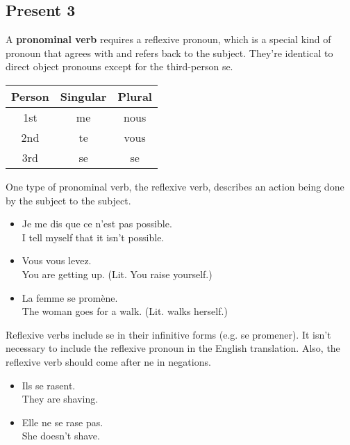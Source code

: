 \subsection{Present 3}

A \textbf{pronominal verb} requires a reflexive pronoun, which is a special kind of pronoun that agrees with and refers back to the subject. They're identical to direct object pronouns except for the third-person se.

\begin{center}\begin{tabular}{|c|c|c|}
\hline
\textbf{Person} & \textbf{Singular} & \textbf{Plural} \\ \hline
1st             & me                & nous            \\ \hline
2nd             & te                & vous            \\ \hline
3rd             & se                & se              \\ \hline
\end{tabular}\end{center}

One type of pronominal verb, the reflexive verb, describes an action being done by the subject to the subject.

\begin{itemize}
  \item  Je me dis que ce n'est pas possible. \\ I tell myself that it isn't possible.
	\item  Vous vous levez. \\ You are getting up. (Lit. You raise yourself.)
	\item  La femme se prom{\`e}ne. \\ The woman goes for a walk. (Lit. walks herself.)
\end{itemize}

Reflexive verbs include se in their infinitive forms (e.g. se promener). It isn't necessary to include the reflexive pronoun in the English translation. Also, the reflexive verb should come after ne in negations.

\begin{itemize}
  \item  Ils se rasent. \\ They are shaving.
	\item  Elle ne se rase pas. \\ She doesn't shave. 
\end{itemize}

